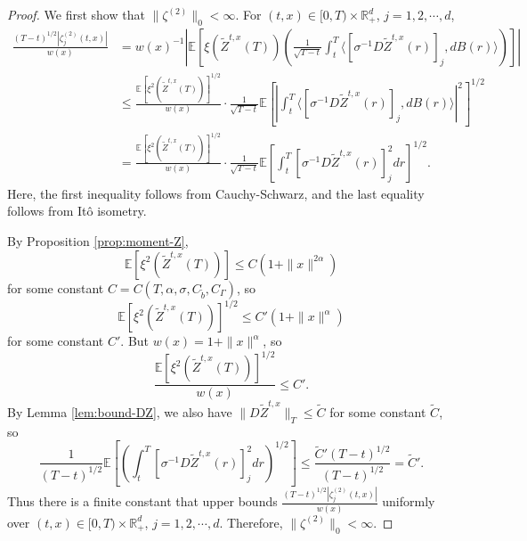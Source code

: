 \documentclass[11pt]{article}
\theoremstyle{definition}
\theoremstyle{plain}
\newcommand{\E}{\mathbb{E}}
\newcommand{\tb}{\tilde{b}}
\begin{document}
\begin{appendices}
\begin{proof}
We first show that \( \|\zeta^{(2)}\|_0 < \infty \).  
For \( (t,x) \in [0,T) \times \mathbb{R}^d_+ \), $j = 1, 2, \cdots, d$, 
\begin{align*}
\frac{(T - t)^{1/2} |\zeta_j^{(2)}(t,x)|}{w(x)} 
&= w(x)^{-1} \left| \mathbb{E} \left[ \xi(\tilde{Z}^{t,x}(T)) \left( \frac{1}{\sqrt{T - t}} \int_t^T \langle \left[\sigma^{-1} D\tilde Z^{t,x}(r)\right]_j, dB(r) \rangle \right) \right] \right|\\
&\leq \frac{ \mathbb{E} \left[ \xi^2(\tilde{Z}^{t,x}(T)) \right]^{1/2} }{w(x)} 
\cdot \frac{1}{\sqrt{T-t}}\mathbb{E} \left[\left| \int_t^T \langle \left[\sigma^{-1} D\tilde Z^{t,x}(r)\right]_j, dB(r) \rangle \right|^2\right]^{1/2} \\
& = \frac{ \mathbb{E} \left[ \xi^2(\tilde{Z}^{t,x}(T)) \right]^{1/2} }{w(x)} 
\cdot \frac{1}{\sqrt{T - t}} \E \left[ \int_t^T \left[\sigma^{-1} D\tilde Z^{t,x}(r)\right]_j^2dr \right]^{1/2}.
\end{align*}
Here, the first inequality follows from Cauchy-Schwarz, and the last equality follows from Itô isometry.

By Proposition \ref{prop:moment-Z},  
\[
\mathbb{E} \left[ \xi^2(\tilde{Z}^{t,x}(T)) \right] \leq C (1 + \|x\|^{2\alpha})
\]  
for some constant \( C = C(T,\alpha,\sigma, C_{\tb}, C_\Gamma) \), so  
\[
\mathbb{E} \left[ \xi^2(\tilde{Z}^{t,x}(T)) \right]^{1/2} \leq C'(1 + \|x\|^\alpha)
\]
for some constant $C'$. But \( w(x) = 1 + \|x\|^\alpha \), so  
\[
\frac{ \mathbb{E} \left[ \xi^2(\tilde{Z}^{t,x}(T)) \right]^{1/2} }{w(x)} \leq C'.
\]
By Lemma \ref{lem:bound-DZ}, we also have \( \|D \tilde{Z}^{t,x}\|_T \leq \tilde C \)  
for some constant \( \tilde C\), so  
\[
\frac{1}{(T - t)^{1/2}} \mathbb{E} \left[ \left( \int_t^T \left[ \sigma^{-1} D \tilde{Z}^{t,x}(r) \right]_j^2 dr \right)^{1/2} \right] 
\leq \frac{\tilde C' (T - t)^{1/2}}{(T - t)^{1/2}} = \tilde C'.
\]
Thus there is a finite constant that upper bounds  
$\frac{(T - t)^{1/2} |\zeta_j^{(2)}(t,x)|}{w(x)}$ uniformly over $(t,x) \in [0,T) \times \mathbb{R}_+^d$, $j = 1, 2, \cdots, d$.
Therefore, $\| \zeta^{(2)} \|_0 < \infty$.


\end{proof}
\end{appendices}
\end{document}
